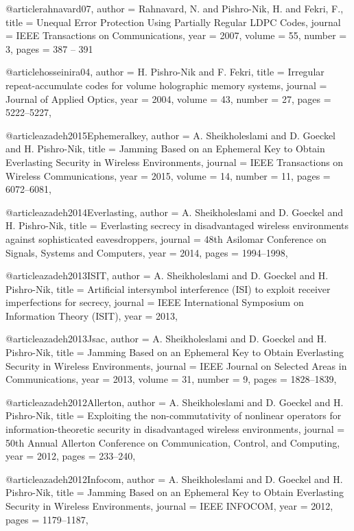 {{{{@article{rahnavard07,
	author = {Rahnavard, N. and Pishro-Nik, H. and Fekri, F.},
	title = {Unequal Error Protection Using Partially Regular LDPC Codes},
	journal = {IEEE Transactions on Communications},
	year = {2007},
	volume = {55},
	number = {3},
	pages = {387 -- 391}
}


@article{hosseinira04,
	author = {H. Pishro-Nik and F. Fekri},
	title = {Irregular repeat-accumulate codes for volume holographic memory systems},
	journal = {Journal of Applied Optics},
	year = {2004},
	volume = {43},
	number = {27},
	pages = {5222--5227},
}


@article{azadeh2015Ephemeralkey,
	author = {A. Sheikholeslami and D. Goeckel and H. Pishro-Nik},
	title = {Jamming Based on an Ephemeral Key to Obtain Everlasting Security in Wireless Environments},
	journal = {IEEE Transactions on Wireless Communications},
	year = {2015},
	volume = {14},
	number = {11},
	pages = {6072--6081},
}


@article{azadeh2014Everlasting,
	author = {A. Sheikholeslami and D. Goeckel and H. Pishro-Nik},
	title = {Everlasting secrecy in disadvantaged wireless environments against sophisticated eavesdroppers},
	journal = {48th Asilomar Conference on Signals, Systems and Computers},
	year = {2014},
	pages = {1994--1998},
}


@article{azadeh2013ISIT,
	author = {A. Sheikholeslami and D. Goeckel and H. Pishro-Nik},
	title = {Artificial intersymbol interference (ISI) to exploit receiver imperfections for secrecy},
	journal = {IEEE International Symposium on Information Theory (ISIT)},
	year = {2013},
}


@article{azadeh2013Jsac,
	author = {A. Sheikholeslami and D. Goeckel and H. Pishro-Nik},
	title = {Jamming Based on an Ephemeral Key to Obtain Everlasting Security in Wireless Environments},
	journal = {IEEE Journal on Selected Areas in Communications},
	year = {2013},
	volume = {31},
	number = {9},
	pages = {1828--1839},
}


@article{azadeh2012Allerton,
	author = {A. Sheikholeslami and D. Goeckel and H. Pishro-Nik},
	title = {Exploiting the non-commutativity of nonlinear operators for information-theoretic security in disadvantaged wireless environments},
	journal = {50th Annual Allerton Conference on Communication, Control, and Computing},
	year = {2012},
	pages = {233--240},
}


@article{azadeh2012Infocom,
	author = {A. Sheikholeslami and D. Goeckel and H. Pishro-Nik},
	title = {Jamming Based on an Ephemeral Key to Obtain Everlasting Security in Wireless Environments},
	journal = {IEEE INFOCOM},
	year = {2012},
	pages = {1179--1187},
}

}}}}
